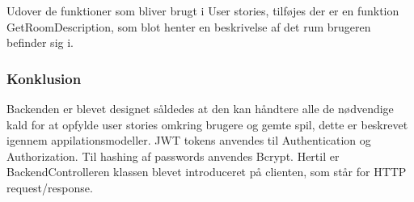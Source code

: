 Udover de funktioner som bliver brugt i User stories, tilføjes der er en funktion GetRoomDescription, som blot henter en beskrivelse af det rum brugeren befinder sig i.\\


\subsubsection{Konklusion}

Backenden er blevet designet såldedes at den kan håndtere alle de nødvendige kald for at opfylde user stories omkring brugere og gemte spil, dette er beskrevet igennem appilationsmodeller. JWT tokens anvendes til Authentication og Authorization. Til hashing af passwords anvendes Bcrypt. Hertil er BackendControlleren klassen blevet introduceret på clienten, som står for HTTP request/response.\\ 


\newpage

